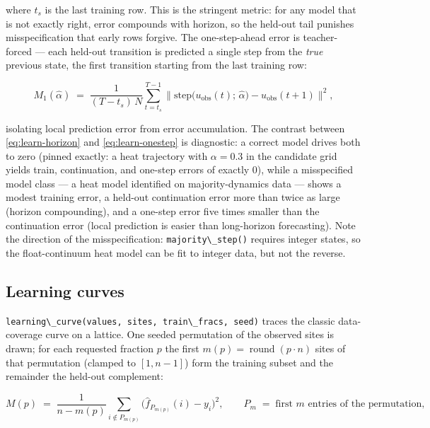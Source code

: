 \documentclass[
  10pt,
]{article}
\newcommand{\passthrough}[1]{#1}
\begin{document}
where \(t_s\) is the last training row. This is the stringent metric:
for any model that is not exactly right, error compounds with horizon,
so the held-out tail punishes misspecification that early rows forgive.
The one-step-ahead error is teacher-forced --- each held-out transition
is predicted a single step from the \emph{true} previous state, the
first transition starting from the last training row:

\begin{equation}
\label{eq:learn-onestep}
M_{1}(\hat{\alpha}) \;=\; \frac{1}{(T - t_s)\,N}
\sum_{t=t_s}^{T-1} \big\lVert
\mathrm{step}\bigl(u_{\mathrm{obs}}(t);\, \hat{\alpha}\bigr)
- u_{\mathrm{obs}}(t+1) \big\rVert^{2},
\end{equation}

isolating local prediction error from error accumulation. The contrast
between \eqref{eq:learn-horizon} and \eqref{eq:learn-onestep} is
diagnostic: a correct model drives both to zero (pinned exactly: a heat
trajectory with \(\alpha = 0.3\) in the candidate grid yields train,
continuation, and one-step errors of exactly \(0\)), while a
misspecified model class --- a heat model identified on
majority-dynamics data --- shows a modest training error, a held-out
continuation error more than twice as large (horizon compounding), and a
one-step error five times smaller than the continuation error (local
prediction is easier than long-horizon forecasting). Note the direction
of the misspecification: \passthrough{\lstinline!majority\_step()!}
requires integer states, so the float-continuum heat model can be fit to
integer data, but not the reverse.

\subsection{Learning curves}\label{learning-curves}

\passthrough{\lstinline!learning\_curve(values, sites, train\_fracs, seed)!}
traces the classic data-coverage curve on a lattice. One seeded
permutation of the observed sites is drawn; for each requested fraction
\(p\) the first \(m(p) = \operatorname{round}(p \cdot n)\) sites of that
permutation (clamped to \([1, n-1]\)) form the training subset and the
remainder the held-out complement:

\begin{equation}
\label{eq:learn-curve}
M(p) \;=\; \frac{1}{n - m(p)} \sum_{i \notin P_{m(p)}}
\bigl( \hat{f}_{P_{m(p)}}(i) - y_i \bigr)^{2},
\qquad P_{m} \;=\; \text{first } m \text{ entries of the permutation},
\end{equation}
\end{document}
